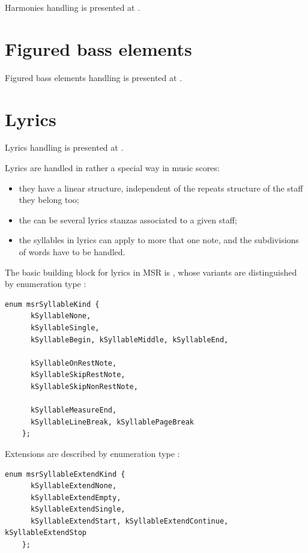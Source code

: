 Harmonies handling is presented at .


\section{Figured bass elements}\label{Figured bass elements}

Figured bass elements handling is presented at .


\section{Lyrics}\label{Lyrics}

Lyrics handling is presented at .

Lyrics are handled in rather a special way in music scores:
\begin{itemize}
\item they have a linear structure, independent of the repeats structure of the staff they belong too;
\item the can be several lyrics stanzas associated to a given staff;
\item the syllables in lyrics can apply to more that one note, and the subdivisions of words have to be handled.
\end{itemize}

The basic building block for lyrics in MSR is , whose variants are distinguished by enumeration type :
\begin{lstlisting}[language=CPlusPlus]
    enum msrSyllableKind {
      kSyllableNone,
      kSyllableSingle,
      kSyllableBegin, kSyllableMiddle, kSyllableEnd,

      kSyllableOnRestNote,
      kSyllableSkipRestNote,
      kSyllableSkipNonRestNote,

      kSyllableMeasureEnd,
      kSyllableLineBreak, kSyllablePageBreak
    };
\end{lstlisting}

Extensions are described by enumeration type {\tt }:
\begin{lstlisting}[language=CPlusPlus]
    enum msrSyllableExtendKind {
      kSyllableExtendNone,
      kSyllableExtendEmpty,
      kSyllableExtendSingle,
      kSyllableExtendStart, kSyllableExtendContinue, kSyllableExtendStop
    };
\end{lstlisting}

